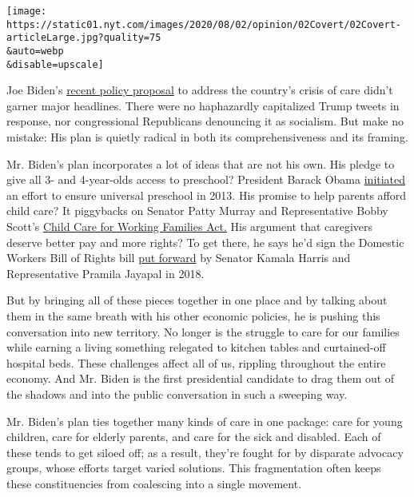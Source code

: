 \texttt{[image: https://static01.nyt.com/images/2020/08/02/opinion/02Covert/02Covert-articleLarge.jpg?quality=75\\\&auto=webp\\\&disable=upscale]}

Joe Biden's
\href{https://www.cnbc.com/2020/07/21/biden-to-unveil-775-billion-plan-to-fund-child-care-and-elder-care.html}{recent
policy proposal} to address the country's crisis of care didn't garner
major headlines. There were no haphazardly capitalized Trump tweets in
response, nor congressional Republicans denouncing it as socialism. But
make no mistake: His plan is quietly radical in both its
comprehensiveness and its framing.

Mr. Biden's plan incorporates a lot of ideas that are not his own. His
pledge to give all 3- and 4-year-olds access to preschool? President
Barack Obama
\href{https://obamawhitehouse.archives.gov/the-press-office/2013/02/13/fact-sheet-president-obama-s-plan-early-education-all-americans}{initiated}
an effort to ensure universal preschool in 2013. His promise to help
parents afford child care? It piggybacks on Senator Patty Murray and
Representative Bobby Scott's
\href{https://www.help.senate.gov/imo/media/doc/CCFWFA\%20Fact\%20Sheet\%20116th\%20Congress\%20FINAL.pdf}{Child
Care for Working Families Act.} His argument that caregivers deserve
better pay and more rights? To get there, he says he'd sign the Domestic
Workers Bill of Rights bill
\href{https://www.thenation.com/article/archive/federal-domestic-workers-bill-of-rights-harris-jayapal-labor/}{put
forward} by Senator Kamala Harris and Representative Pramila Jayapal in
2018.

But by bringing all of these pieces together in one place and by talking
about them in the same breath with his other economic policies, he is
pushing this conversation into new territory. No longer is the struggle
to care for our families while earning a living something relegated to
kitchen tables and curtained-off hospital beds. These challenges affect
all of us, rippling throughout the entire economy. And Mr. Biden is the
first presidential candidate to drag them out of the shadows and into
the public conversation in such a sweeping way.

Mr. Biden's plan ties together many kinds of care in one package: care
for young children, care for elderly parents, and care for the sick and
disabled. Each of these tends to get siloed off; as a result, they're
fought for by disparate advocacy groups, whose efforts target varied
solutions. This fragmentation often keeps these constituencies from
coalescing into a single movement.

